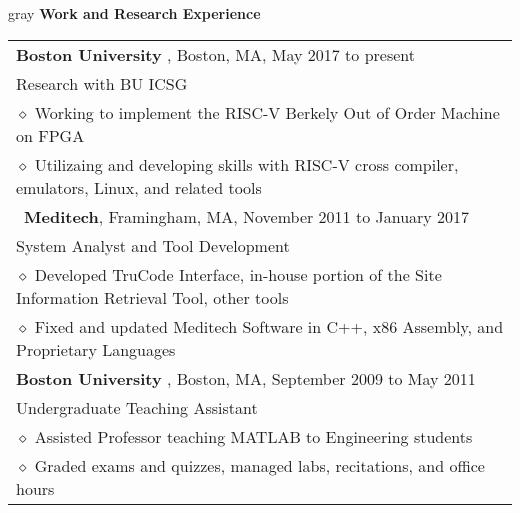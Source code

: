\documentclass[10.5pt,letterpaper]{article}
\newcommand{\org}[1]{\textbf{#1}}
\newcommand{\pseudoitem}{\diamond}
\newcommand{\vertspace}{\vspace{1.2mm}}
\newcommand{\horzindent}{\hspace{3mm}}
\newcommand{\minorindent}{\hspace{4.5mm}}
\newcommand{\minoritem}{\minorindent $\pseudoitem$ }
\newcommand{\tablewidth}{.9\linewidth}
\newcommand{\undergrad}{Boston University}
\newcommand{\grad}{Boston University}
\begin{document}
	\fi
			
	\vertspace
	\noindent
	\begin{heading}{gray}
		\textbf{Work and Research Experience} 
	\end{heading}
		\begin{tabular*}{\tablewidth}{@{\extracolsep{\fill}}l}
			\org{\grad} , Boston, MA, May 2017 to present\\
			\horzindent Research with BU ICSG\\
			\minoritem Working to implement the RISC-V Berkely Out of Order Machine on FPGA\\
			\minoritem Utilizaing and developing skills with RISC-V cross compiler, emulators, Linux, and related tools\\\
			\org{Meditech}, Framingham, MA, November 2011 to January 2017\\
			\horzindent System Analyst and Tool Development \\
			\minoritem Developed TruCode Interface, in-house portion of the Site Information Retrieval Tool, other tools \\
			\minoritem Fixed and updated Meditech Software in C++, x86 Assembly, and Proprietary Languages \\
			\org{\undergrad} , Boston, MA, September 2009 to May 2011 \\
			\horzindent Undergraduate Teaching Assistant \\
			\minoritem Assisted Professor teaching MATLAB to Engineering students \\
			\minoritem Graded exams and quizzes, managed labs, recitations, and office hours \\
		\end{tabular*}
	
\end{document}
